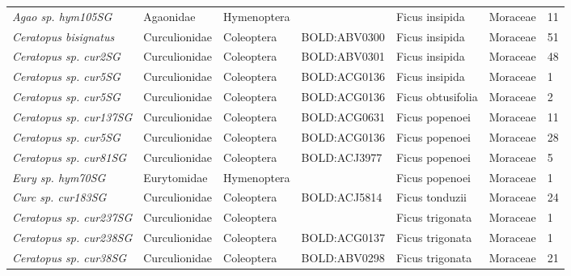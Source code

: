 \documentclass[11pt]{article}
\begin{document}
\begin{landscape}
\begin{longtable}{@{}lllllll@{}}
\textit{Agao sp. hym105SG}                            & Agaonidae       & Hymenoptera  &              & Ficus insipida                     & Moraceae         & 11    \\
\textit{Ceratopus bisignatus}                         & Curculionidae   & Coleoptera   & BOLD:ABV0300 & Ficus insipida                     & Moraceae         & 51    \\
\textit{Ceratopus sp. cur2SG}                         & Curculionidae   & Coleoptera   & BOLD:ABV0301 & Ficus insipida                     & Moraceae         & 48    \\
\textit{Ceratopus sp. cur5SG}                         & Curculionidae   & Coleoptera   & BOLD:ACG0136 & Ficus insipida                     & Moraceae         & 1     \\
\textit{Ceratopus sp. cur5SG}                         & Curculionidae   & Coleoptera   & BOLD:ACG0136 & Ficus obtusifolia                  & Moraceae         & 2     \\
\textit{Ceratopus sp. cur137SG}                       & Curculionidae   & Coleoptera   & BOLD:ACG0631 & Ficus popenoei                     & Moraceae         & 11    \\
\textit{Ceratopus sp. cur5SG}                         & Curculionidae   & Coleoptera   & BOLD:ACG0136 & Ficus popenoei                     & Moraceae         & 28    \\
\textit{Ceratopus sp. cur81SG}                        & Curculionidae   & Coleoptera   & BOLD:ACJ3977 & Ficus popenoei                     & Moraceae         & 5     \\
\textit{Eury sp. hym70SG}                             & Eurytomidae     & Hymenoptera  &              & Ficus popenoei                     & Moraceae         & 1     \\
\textit{Curc sp. cur183SG}                            & Curculionidae   & Coleoptera   & BOLD:ACJ5814 & Ficus tonduzii                     & Moraceae         & 24    \\
\textit{Ceratopus sp. cur237SG}                       & Curculionidae   & Coleoptera   &              & Ficus trigonata                    & Moraceae         & 1     \\
\textit{Ceratopus sp. cur238SG}                       & Curculionidae   & Coleoptera   & BOLD:ACG0137 & Ficus trigonata                    & Moraceae         & 1     \\
\textit{Ceratopus sp. cur38SG}                        & Curculionidae   & Coleoptera   & BOLD:ABV0298 & Ficus trigonata                    & Moraceae         & 21    \\

\end{longtable}
\end{landscape}
\end{document}
